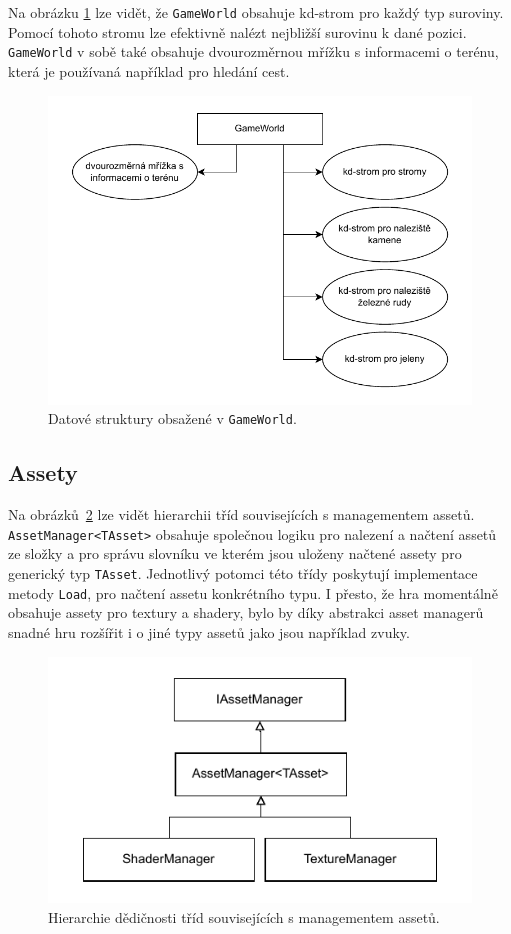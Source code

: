 Na obrázku \ref{fig:game-world} lze vidět, že \texttt{GameWorld} obsahuje kd-strom pro každý typ suroviny. Pomocí tohoto stromu lze efektivně nalézt nejbližší surovinu k dané pozici. \texttt{GameWorld} v sobě také obsahuje dvourozměrnou mřížku s informacemi o terénu, která je používaná například pro hledání cest.

\begin{figure}[!htb]
  \centering
  \includegraphics[width=0.6\linewidth]{img/game-world.pdf}
  \caption{Datové struktury obsažené v \texttt{GameWorld}.}
  \label{fig:game-world}
\end{figure}

\subsection{Assety}
Na obrázků~\ref{fig:asset-manager} lze vidět hierarchii tříd souvisejících s managementem assetů. \texttt{AssetManager<TAsset>} obsahuje společnou logiku pro nalezení a načtení assetů ze složky a pro správu slovníku ve kterém jsou uloženy načtené assety pro generický typ \texttt{TAsset}. Jednotlivý potomci této třídy poskytují implementace metody \texttt{Load}, pro načtení assetu konkrétního typu. I přesto, že hra momentálně obsahuje assety pro textury a shadery, bylo by díky abstrakci asset managerů snadné hru rozšířit i o jiné typy assetů jako jsou například zvuky.

\begin{figure}[!htb]
  \centering
  \includegraphics[width=0.6\linewidth]{img/asset-manager.pdf}
  \caption{Hierarchie dědičnosti tříd souvisejících s managementem assetů.}
  \label{fig:asset-manager}
\end{figure}

